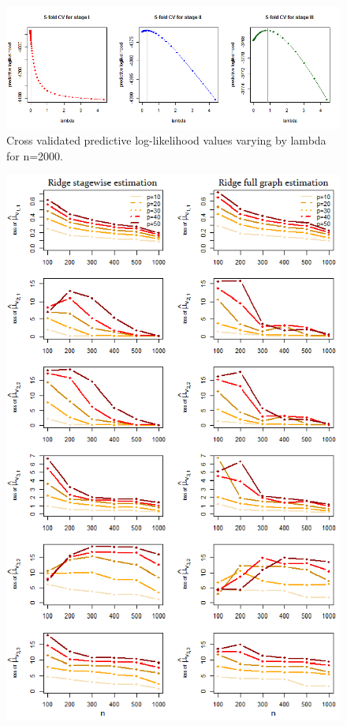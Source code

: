 \documentclass[10pt]{article}
\begin{document}
\begin{figure}
\begin{center}
 \includegraphics[scale=.6]{lmd-cv.png}
\end{center}
\caption{Cross validated predictive log-likelihood values varying by lambda for n=2000.}
\label{fig:lambda}
\end{figure}
\begin{figure}
\begin{center}
 \includegraphics[scale=.6]{mu_err.png}

\end{center}
\end{figure}
\end{document}
